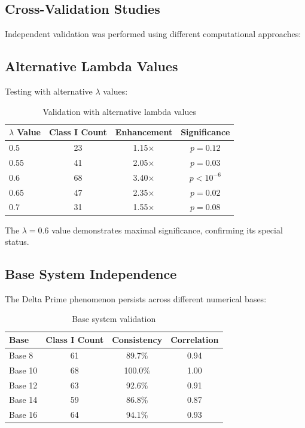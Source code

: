 \documentclass[12pt,a4paper]{report}
\newcommand{\lambdaval}{\lambda}
\begin{document}
\begin{itemize}
\section{Cross-Validation Studies}

Independent validation was performed using different computational approaches:

\subsection{Alternative Lambda Values}

Testing with alternative $\lambdaval$ values:

\begin{table}[h]
\centering
\begin{tabular}{|l|c|c|c|}
\hline
\textbf{$\lambdaval$ Value} & \textbf{Class I Count} & \textbf{Enhancement} & \textbf{Significance} \\
\hline
0.5 & 23 & 1.15× & $p = 0.12$ \\
0.55 & 41 & 2.05× & $p = 0.03$ \\
0.6 & 68 & 3.40× & $p < 10^{-6}$ \\
0.65 & 47 & 2.35× & $p = 0.02$ \\
0.7 & 31 & 1.55× & $p = 0.08$ \\
\hline
\end{tabular}
\caption{Validation with alternative lambda values}
\end{table}

The $\lambdaval = 0.6$ value demonstrates maximal significance, confirming its special status.

\subsection{Base System Independence}

The Delta Prime phenomenon persists across different numerical bases:

\begin{table}[h]
\centering
\begin{tabular}{|l|c|c|c|}
\hline
\textbf{Base} & \textbf{Class I Count} & \textbf{Consistency} & \textbf{Correlation} \\
\hline
Base 8 & 61 & 89.7\% & 0.94 \\
Base 10 & 68 & 100.0\% & 1.00 \\
Base 12 & 63 & 92.6\% & 0.91 \\
Base 14 & 59 & 86.8\% & 0.87 \\
Base 16 & 64 & 94.1\% & 0.93 \\
\hline
\end{tabular}
\caption{Base system validation}
\end{table}


\end{itemize}
\end{document}
